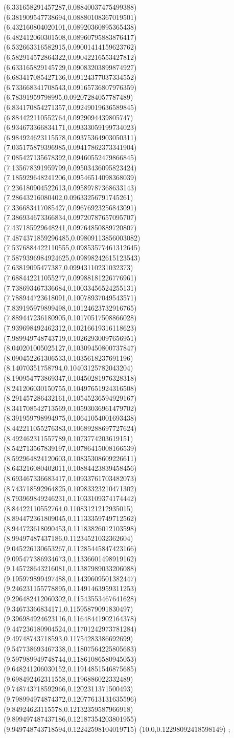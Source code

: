 {(6.331658291457287,0.08840037475499388)
(6.381909547738694,0.08880108367019501)
(6.432160804020101,0.08920360895365438)
(6.482412060301508,0.08960795883876417)
(6.532663316582915,0.09001414159623762)
(6.582914572864322,0.09042216553427812)
(6.633165829145729,0.09083203899874927)
(6.683417085427136,0.09124377037334552)
(6.733668341708543,0.09165736807976359)
(6.78391959798995,0.09207284057787489)
(6.834170854271357,0.09249019636589845)
(6.884422110552764,0.0929094439805747)
(6.934673366834171,0.09333059199734023)
(6.984924623115578,0.09375364903050311)
(7.035175879396985,0.09417862373341904)
(7.085427135678392,0.09460552479866845)
(7.135678391959799,0.09503436095823424)
(7.185929648241206,0.09546514098368039)
(7.236180904522613,0.09589787368633143)
(7.28643216080402,0.09633256791745261)
(7.336683417085427,0.09676923256843091)
(7.386934673366834,0.09720787657095707)
(7.437185929648241,0.09764850889720807)
(7.4874371859296485,0.09809113856003082)
(7.5376884422110555,0.09853577461312645)
(7.5879396984924625,0.09898242615123543)
(7.63819095477387,0.09943110231032373)
(7.688442211055277,0.09988181226776961)
(7.738693467336684,0.10033456524255131)
(7.788944723618091,0.10078937049543571)
(7.839195979899498,0.10124623732916765)
(7.889447236180905,0.10170517508866028)
(7.939698492462312,0.10216619316118623)
(7.989949748743719,0.10262930097656951)
(8.040201005025127,0.10309450800737847)
(8.090452261306533,0.1035618237691196)
(8.14070351758794,0.10403125782043204)
(8.190954773869347,0.10450281976328318)
(8.241206030150755,0.10497651924316508)
(8.291457286432161,0.10545236594929167)
(8.341708542713569,0.10593036961479702)
(8.391959798994975,0.10641054001693438)
(8.442211055276383,0.10689288697727624)
(8.492462311557789,0.1073774203619151)
(8.542713567839197,0.10786415008166539)
(8.592964824120603,0.10835308609226611)
(8.643216080402011,0.10884423839458456)
(8.693467336683417,0.10933761703482073)
(8.743718592964825,0.10983323210471302)
(8.793969849246231,0.11033109374174442)
(8.84422110552764,0.11083121212935015)
(8.894472361809045,0.11133359749712562)
(8.944723618090453,0.11183826012103598)
(8.99497487437186,0.11234521032362604)
(9.045226130653267,0.11285445847423166)
(9.095477386934673,0.11336601498919162)
(9.145728643216081,0.11387989033206088)
(9.195979899497488,0.11439609501382447)
(9.246231155778895,0.11491463959311253)
(9.296482412060302,0.11543553467641628)
(9.34673366834171,0.11595879091830497)
(9.396984924623116,0.11648441902164378)
(9.447236180904524,0.11701242973781284)
(9.49748743718593,0.11754283386692699)
(9.547738693467338,0.11807564225805683)
(9.597989949748744,0.11861086580945053)
(9.648241206030152,0.11914851546875685)
(9.698492462311558,0.1196886022332489)
(9.748743718592966,0.1202311371500493)
(9.798994974874372,0.12077613131635596)
(9.84924623115578,0.12132359587966918)
(9.899497487437186,0.12187354203801955)
(9.949748743718594,0.12242598104019715)
(10.0,0.12298092418598149)
};
